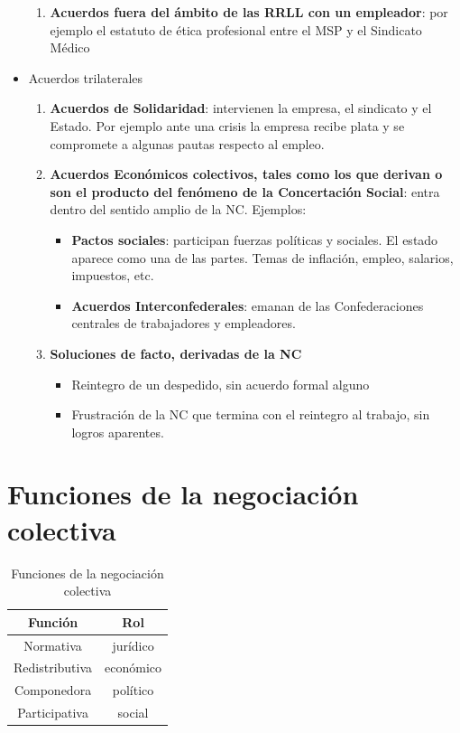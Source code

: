 \documentclass[spanish,12pt,a4paper,titlepage]{report}
\begin{document}
\begin{itemize}
\begin{enumerate}
		\item \textbf{Acuerdos fuera del ámbito de las RRLL con un empleador}: por ejemplo el estatuto de ética profesional entre el MSP y el Sindicato Médico
	\end{enumerate}
	\item Acuerdos trilaterales
	\begin{enumerate}
		\item \textbf{Acuerdos de Solidaridad}: intervienen la empresa, el sindicato y el Estado. Por ejemplo ante una crisis la empresa recibe plata y se compromete a algunas pautas respecto al empleo.
		\item \textbf{Acuerdos Económicos colectivos, tales como los que derivan o son el producto del fenómeno de la Concertación Social}: entra dentro del sentido amplio de la NC. Ejemplos:
		\begin{itemize}
			\item \textbf{Pactos sociales}: participan fuerzas políticas y sociales. El estado aparece como una de las partes. Temas de inflación, empleo, salarios, impuestos, etc.
			\item \textbf{Acuerdos Interconfederales}: emanan de las Confederaciones centrales de trabajadores y empleadores.
		\end{itemize}
		\item \textbf{Soluciones de facto, derivadas de la NC}
		\begin{itemize}
			\item Reintegro de un despedido, sin acuerdo formal alguno
			\item Frustración de la NC que termina con el reintegro al trabajo, sin logros aparentes.
		\end{itemize}
	\end{enumerate}
\end{itemize}

\section{Funciones de la negociación colectiva}
\begin{table}[H]
\begin{center}
\begin{tabular}{|c|c|} 
\hline \cellcolor[gray]{0.8} \centering \textbf{Función} & \cellcolor[gray]{0.8} \textbf{Rol} \\ \hline
Normativa & jurídico \\ \hline
Redistributiva & económico \\ \hline
Componedora & político\\ \hline
Participativa & social\\ \hline
\end{tabular} 
\end{center}
\caption{Funciones de la negociación colectiva}
\label{tab:funcionesNC}
\end{table}
\end{document}
